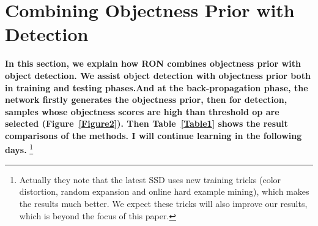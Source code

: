 \documentclass[40pt]{article}
\begin{document}
\section{Combining Objectness Prior with Detection}
\textbf{In this section, we explain how RON combines objectness prior with object detection. We assist object detection with objectness prior both in training and testing phases.And at the back-propagation phase, the network ﬁrstly generates the objectness prior, then for detection, samples whose objectness scores are high than threshold op are selected (Figure~\ref{Figure2}). Then Table~\ref{Table1} shows the result comparisons of the methods. I will continue learning in the following days.}
\footnote{Actually they note that the latest SSD uses new training tricks (color distortion, random expansion and online hard example mining), which makes the results much better. We expect these tricks will also improve our results, which is beyond the focus of this paper. }
\end{document}
